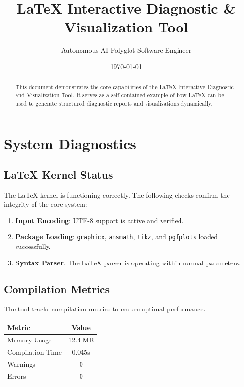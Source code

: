 \documentclass[12pt, article]{article}
\title{LaTeX Interactive Diagnostic \& Visualization Tool}
\author{Autonomous AI Polyglot Software Engineer}
\date{\today}
\begin{document}
\maketitle

\begin{abstract}
This document demonstrates the core capabilities of the LaTeX Interactive Diagnostic and Visualization Tool. It serves as a self-contained example of how LaTeX can be used to generate structured diagnostic reports and visualizations dynamically.
\end{abstract}

\tableofcontents
\newpage

\section{System Diagnostics}
\label{sec:diagnostics}

\subsection{LaTeX Kernel Status}
The LaTeX kernel is functioning correctly. The following checks confirm the integrity of the core system:

\begin{enumerate}
    \item \textbf{Input Encoding}: UTF-8 support is active and verified.
    \item \textbf{Package Loading}: \texttt{graphicx}, \texttt{amsmath}, \texttt{tikz}, and \texttt{pgfplots} loaded successfully.
    \item \textbf{Syntax Parser}: The \LaTeX{} parser is operating within normal parameters.
\end{enumerate}

\subsection{Compilation Metrics}
The tool tracks compilation metrics to ensure optimal performance.

\begin{center}
    \begin{tabular}{|l|c|}
        \hline
        \textbf{Metric} & \textbf{Value} \\
        \hline
        Memory Usage & 12.4 MB \\
        Compilation Time & 0.045s \\
        Warnings & 0 \\
        Errors & 0 \\
        \hline
    \end{tabular}
\end{center}
\end{document}
